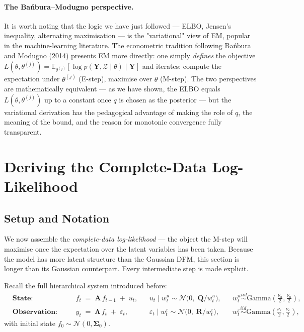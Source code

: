 \documentclass[11pt, a4paper, oneside]{article}
\newcommand{\mY}{\mathbf{Y}}
\newcommand{\mL}{\boldsymbol{\Lambda}}
\newcommand{\mA}{\mathbf{A}}
\newcommand{\mR}{\mathbf{R}}
\newcommand{\mQ}{\mathbf{Q}}
\begin{document}
\paragraph{The Bańbura–Modugno perspective.}
It is worth noting that the logic we have just followed — ELBO, Jensen's
inequality, alternating maximisation — is the "variational" view of EM,
popular in the machine-learning literature. The econometric tradition
following Bańbura and Modugno (2014) presents EM more directly: one
simply \emph{defines} the objective
$L(\theta, \theta^{(j)}) = \mathbb{E}_{\theta^{(j)}}[\log p(\mY, \mathcal{Z} \mid \theta) \mid \mY]$
and iterates: compute the expectation under $\theta^{(j)}$ (E-step),
maximise over $\theta$ (M-step). The two perspectives are mathematically
equivalent — as we have shown, the ELBO equals
$L(\theta, \theta^{(j)})$ up to a constant once $q$ is chosen as the
posterior — but the variational derivation has the pedagogical
advantage of making the role of $q$, the meaning of the bound, and the
reason for monotonic convergence fully transparent.

\newpage

\section{Deriving the Complete-Data Log-Likelihood}
\label{sec:complete-loglik}

\subsection{Setup and Notation}

We now assemble the \emph{complete-data log-likelihood} — the object the
M-step will maximise once the expectation over the latent variables has
been taken. Because the model has more latent structure than the Gaussian
DFM, this section is longer than its Gaussian counterpart. Every
intermediate step is made explicit.

Recall the full hierarchical system introduced before:
\begin{align*}
&\textbf{State:}\quad
    && f_t \;=\; \mA\, f_{t-1} \;+\; u_t,
    && u_t \mid w^u_t \sim \mathcal{N}\!\big(0,\; \mQ / w^u_t\big),
    && w^u_t \overset{iid}{\sim} \mathrm{Gamma}(\tfrac{\nu_u}{2}, \tfrac{\nu_u}{2}), \\
&\textbf{Observation:}\quad
    && y_t \;=\; \mL\, f_t \;+\; \varepsilon_t,
    && \varepsilon_t \mid w^\varepsilon_t \sim \mathcal{N}\!\big(0,\; \mR / w^\varepsilon_t\big),
    && w^\varepsilon_t \overset{iid}{\sim} \mathrm{Gamma}(\tfrac{\nu_\varepsilon}{2}, \tfrac{\nu_\varepsilon}{2}),
\end{align*}
with initial state $f_0 \sim \mathcal{N}(0, \boldsymbol{\Sigma}_0)$. 
\end{document}

